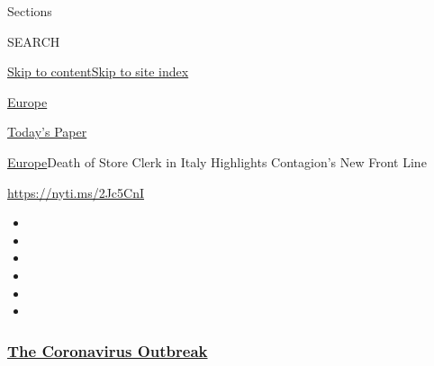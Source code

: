 Sections

SEARCH

\protect\hyperlink{site-content}{Skip to
content}\protect\hyperlink{site-index}{Skip to site index}

\href{https://www.nytimes3xbfgragh.onion/section/world/europe}{Europe}

\href{https://myaccount.nytimes3xbfgragh.onion/auth/login?response_type=cookie\&client_id=vi}{}

\href{https://www.nytimes3xbfgragh.onion/section/todayspaper}{Today's
Paper}

\href{/section/world/europe}{Europe}\textbar{}Death of Store Clerk in
Italy Highlights Contagion's New Front Line

\url{https://nyti.ms/2Jc5CnI}

\begin{itemize}
\item
\item
\item
\item
\item
\item
\end{itemize}

\hypertarget{the-coronavirus-outbreak}{%
\subsubsection{\texorpdfstring{\href{https://www.nytimes3xbfgragh.onion/news-event/coronavirus?name=styln-coronavirus-national\&region=TOP_BANNER\&block=storyline_menu_recirc\&action=click\&pgtype=Article\&impression_id=5bb89e10-efbb-11ea-88d9-652181eb49b5\&variant=undefined}{The
Coronavirus
Outbreak}}{The Coronavirus Outbreak}}\label{the-coronavirus-outbreak}}

